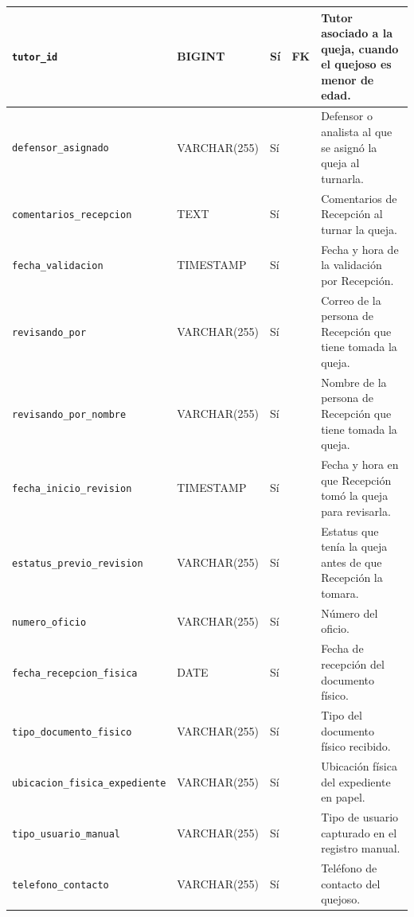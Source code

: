 \begin{longtable}{|L{3.9cm}|L{2.4cm}|L{0.9cm}|L{1.2cm}|L{6.6cm}|}
		\texttt{tutor\_\allowbreak{}id} & BIGINT & Sí & FK & Tutor asociado a la queja, cuando el quejoso es menor de edad. \\ \hline
		\texttt{defensor\_\allowbreak{}asignado} & VARCHAR(255) & Sí &  & Defensor o analista al que se asignó la queja al turnarla. \\ \hline
		\texttt{comentarios\_\allowbreak{}recepcion} & TEXT & Sí &  & Comentarios de Recepción al turnar la queja. \\ \hline
		\texttt{fecha\_\allowbreak{}validacion} & TIMESTAMP & Sí &  & Fecha y hora de la validación por Recepción. \\ \hline
		\texttt{revisando\_\allowbreak{}por} & VARCHAR(255) & Sí &  & Correo de la persona de Recepción que tiene tomada la queja. \\ \hline
		\texttt{revisando\_\allowbreak{}por\_\allowbreak{}nombre} & VARCHAR(255) & Sí &  & Nombre de la persona de Recepción que tiene tomada la queja. \\ \hline
		\texttt{fecha\_\allowbreak{}inicio\_\allowbreak{}revision} & TIMESTAMP & Sí &  & Fecha y hora en que Recepción tomó la queja para revisarla. \\ \hline
		\texttt{estatus\_\allowbreak{}previo\_\allowbreak{}revision} & VARCHAR(255) & Sí &  & Estatus que tenía la queja antes de que Recepción la tomara. \\ \hline
		\texttt{numero\_\allowbreak{}oficio} & VARCHAR(255) & Sí &  & Número del oficio. \\ \hline
		\texttt{fecha\_\allowbreak{}recepcion\_\allowbreak{}fisica} & DATE & Sí &  & Fecha de recepción del documento físico. \\ \hline
		\texttt{tipo\_\allowbreak{}documento\_\allowbreak{}fisico} & VARCHAR(255) & Sí &  & Tipo del documento físico recibido. \\ \hline
		\texttt{ubicacion\_\allowbreak{}fisica\_\allowbreak{}expediente} & VARCHAR(255) & Sí &  & Ubicación física del expediente en papel. \\ \hline
		\texttt{tipo\_\allowbreak{}usuario\_\allowbreak{}manual} & VARCHAR(255) & Sí &  & Tipo de usuario capturado en el registro manual. \\ \hline
		\texttt{telefono\_\allowbreak{}contacto} & VARCHAR(255) & Sí &  & Teléfono de contacto del quejoso. \\ \hline
\end{longtable}
\normalsize
\setlength{\tabcolsep}{6pt}
\renewcommand{\arraystretch}{1}

